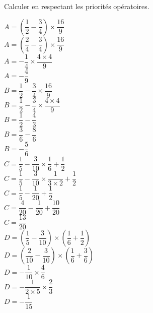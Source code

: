 \begin{corrige}
    Calculer en respectant les priorités opératoires.
            \begin{spacing}{1.5}
                \begin{itemize}
                    \def\item{}
                    \item $A=\left(\dfrac{1}{2}-\dfrac{3}{4}\right)\times\dfrac{16}{9}$\\
                    {\red $A=\left(\dfrac{2}{4}-\dfrac{3}{4}\right)\times\dfrac{16}{9}$}\\
                    {\red $A=-\dfrac{1}{4}\times\dfrac{4\times 4}{9}$}\\
                    {\red $A=-\dfrac{4}{9}$}\\
                    \item $B=\dfrac{1}{2}-\dfrac{3}{4}\times\dfrac{16}{9}$\\
                    {\red $B=\dfrac{1}{2}-\dfrac{3}{4}\times\dfrac{4\times 4}{9}$}\\
                    {\red $B=\dfrac{1}{2}-\dfrac{4}{3}$}\\
                    {\red $B=\dfrac{3}{6}-\dfrac{8}{6}$}\\
                    {\red $B=-\dfrac{5}{6}$}\\
                    \item $C=\dfrac{1}{5}-\dfrac{3}{10}\times\dfrac{1}{6}+\dfrac{1}{2}$\\
                    {\red $C=\dfrac{1}{5}-\dfrac{3}{10}\times\dfrac{1}{3\times 2}+\dfrac{1}{2}$}\\
                    {\red $C=\dfrac{1}{5}-\dfrac{1}{20}+\dfrac{1}{2}$}\\
                    {\red $C=\dfrac{4}{20}-\dfrac{1}{20}+\dfrac{10}{20}$}\\
                    {\red $C=\dfrac{13}{20}$}\\
                    \item $D=\left(\dfrac{1}{5}-\dfrac{3}{10}\right)\times\left(\dfrac{1}{6}+\dfrac{1}{2}\right)$\\
                    {\red $D=\left(\dfrac{2}{10}-\dfrac{3}{10}\right)\times\left(\dfrac{1}{6}+\dfrac{3}{6}\right)$}\\
                    {\red $D=-\dfrac{1}{10}\times\dfrac{4}{6}$}\\
                    {\red $D=-\dfrac{1}{2\times 5}\times\dfrac{2}{3}$}\\
                    {\red $D=-\dfrac{1}{15}$}
                \end{itemize}
            \end{spacing}
\end{corrige}

